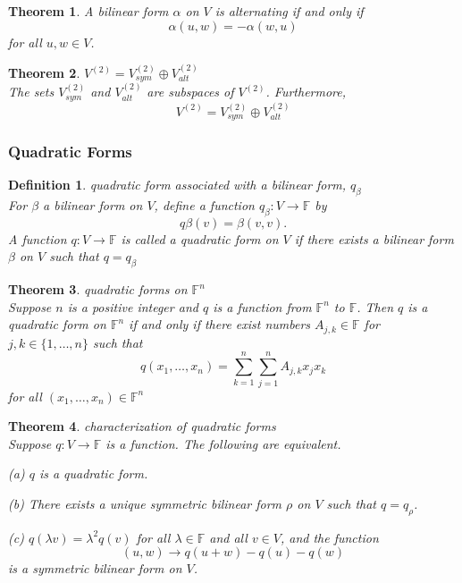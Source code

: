 \documentclass{article}
\newtheorem{theorem}{Theorem}[subsection]
\newtheorem{definition}{Definition}[subsection]
\newcommand{\FF}{\mathbb{F}}
\begin{document}
\begin{CJK}{UTF8}{gkai}
\begin{theorem}
    A bilinear form $\alpha$ on $V$ is alternating if and only if
    \[\alpha(u,w) = -\alpha(w,u)\]
    for all $u,w \in V$.
\end{theorem}

\begin{theorem}
    $V^{(2)} = V^{(2)}_{sym} \oplus V^{(2)}_{alt}$\\

    The sets $V^{(2)}_{sym}$ and $V^{(2)}_{alt}$ are subspaces of $V^{(2)}$. Furthermore,
    \[V^{(2)} = V^{(2)}_{sym} \oplus V^{(2)}_{alt}\]
\end{theorem}

\subsubsection{Quadratic Forms}

\begin{definition}
    quadratic form associated with a bilinear form, $q_\beta$\\

    For $\beta$ a bilinear form on $V$, define a function $q_\beta: V \to \FF$ by 
    \[q\beta(v) = \beta(v,v).\]
    A function $q: V \to \FF$ is called a quadratic form on $V$ if there exists a bilinear form $\beta$ on $V$ such that $q = q_\beta$
\end{definition}

\begin{theorem}
    quadratic forms on $\FF^n$\\

    Suppose $n$ is a positive integer and $q$ is a function from $\FF^n$ to $\FF$. Then $q$ is a quadratic form on $\FF^n$ if and only if there exist numbers $A_{j,k} \in \FF$ for $j, k \in \{1,\ldots,n\}$ such that
    \[q(x_1, \ldots,x_n) =\sum_{k = 1}^{n}\sum_{j = 1}^{n}A_{j,k}x_j x_k\]
    for all $(x_1,\ldots,x_n) \in \FF^n$
\end{theorem}

\begin{theorem}
    characterization of quadratic forms\\

    Suppose $q: V \to \FF$ is a function. The following are equivalent.

    (a) $q$ is a quadratic form.

    (b) There exists a unique symmetric bilinear form $\rho$ on $V$ such that $q = q_{\rho}$.

    (c) $q(\lambda v) = \lambda^2 q(v)$ for all $\lambda \in \FF$ and all $v \in V$, and the function
    \[(u, w) \to q(u+w)-q(u)-q(w)\]
    is a symmetric bilinear form on $V$.


\end{theorem}
\end{CJK}
\end{document}
